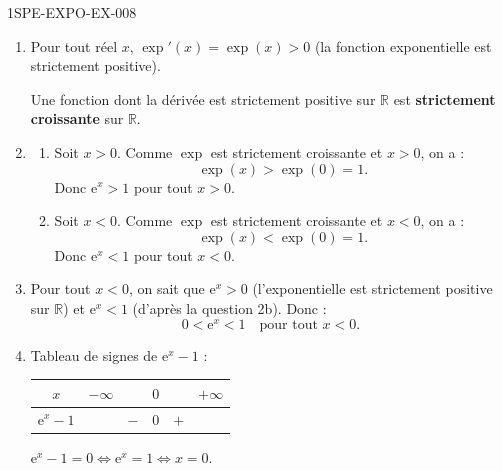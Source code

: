 \begin{corrige}{1SPE-EXPO-EX-008}
\begin{enumerate}
\item Pour tout réel $x$, $\exp'(x) = \exp(x) > 0$ (la fonction exponentielle est strictement positive).

Une fonction dont la dérivée est strictement positive sur $\mathbb{R}$ est \textbf{strictement croissante} sur $\mathbb{R}$.

\item
\begin{enumerate}
\item Soit $x > 0$. Comme $\exp$ est strictement croissante et $x > 0$, on a :
\[\exp(x) > \exp(0) = 1.\]
Donc $\mathrm{e}^x > 1$ pour tout $x > 0$.

\item Soit $x < 0$. Comme $\exp$ est strictement croissante et $x < 0$, on a :
\[\exp(x) < \exp(0) = 1.\]
Donc $\mathrm{e}^x < 1$ pour tout $x < 0$.
\end{enumerate}

\item Pour tout $x < 0$, on sait que $\mathrm{e}^x > 0$ (l'exponentielle est strictement positive sur $\mathbb{R}$) et $\mathrm{e}^x < 1$ (d'après la question 2b). Donc :
\[0 < \mathrm{e}^x < 1 \quad \text{pour tout } x < 0.\]

\item Tableau de signes de $\mathrm{e}^x - 1$ :

\begin{center}
\begin{tabular}{|c|ccccc|}
\hline
$x$ & $-\infty$ & & $0$ & & $+\infty$ \\
\hline
$\mathrm{e}^x - 1$ & & $-$ & $0$ & $+$ & \\
\hline
\end{tabular}
\end{center}

$\mathrm{e}^x - 1 = 0 \Leftrightarrow \mathrm{e}^x = 1 \Leftrightarrow x = 0$.
\end{enumerate}
\end{corrige}
